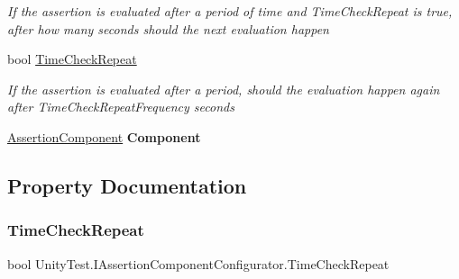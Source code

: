 \begin{DoxyCompactItemize}
\begin{DoxyCompactList}\small\item\em If the assertion is evaluated after a period of time and Time\+Check\+Repeat is true, after how many seconds should the next evaluation happen \end{DoxyCompactList}\item 
bool \hyperlink{interface_unity_test_1_1_i_assertion_component_configurator_af15c774515b157229e4cf8113fb7836f}{Time\+Check\+Repeat}
\begin{DoxyCompactList}\small\item\em If the assertion is evaluated after a period, should the evaluation happen again after Time\+Check\+Repeat\+Frequency seconds \end{DoxyCompactList}\item 
\mbox{\label{interface_unity_test_1_1_i_assertion_component_configurator_ac147fc3616e942c0dfd6dc7bf3a78d79}} 
\hyperlink{class_unity_test_1_1_assertion_component}{Assertion\+Component} {\bfseries Component}
\end{DoxyCompactItemize}


\subsection{Property Documentation}
\mbox{\label{interface_unity_test_1_1_i_assertion_component_configurator_af15c774515b157229e4cf8113fb7836f}} 
\subsubsection{\texorpdfstring{Time\+Check\+Repeat}{TimeCheckRepeat}}
{\footnotesize\ttfamily bool Unity\+Test.\+I\+Assertion\+Component\+Configurator.\+Time\+Check\+Repeat\hspace{0.3cm}{\ttfamily [set]}}




